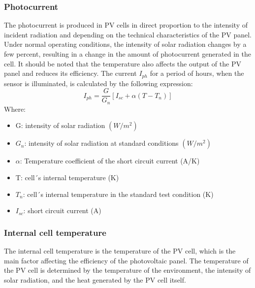 \documentclass{report}
\begin{document}
\subsubsection{Photocurrent}
The photocurrent is produced in PV cells in direct proportion to the intensity of incident radiation and depending on the technical characteristics of the PV panel. Under normal operating conditions, the intensity of solar radiation changes by a few percent, resulting in a change in the amount of photocurrent generated in the cell. It should be noted that the temperature also affects the output of the PV panel and reduces its efficiency. The current $I_{ph}$ for a period of hours, when the sensor is illuminated, is calculated by the following expression:
\begin{equation}
I_{ph} = \frac{G}{G_{n}} 
 \left[ I_{sc} + 	\alpha(T- T_{n}) \right] 
\end{equation}
Where:
\begin{itemize}
    \item G: intensity of solar radiation $(W/m^2)$
    \item $G_{n}$: intensity of solar radiation at standard conditions $(W/m^2)$
    \item $\alpha$: Temperature coefficient of the short circuit current (A/K)
    \item T: cell´s internal temperature (K)
    \item $T_{n}$: cell´s internal temperature in the standard test condition (K)
    \item $I_{sc}$: short circuit current (A)
\end{itemize}

\subsubsection{Internal cell temperature}
The internal cell temperature is the temperature of the PV cell, which is the main factor affecting the efficiency of the photovoltaic panel. The temperature of the PV cell is determined by the temperature of the environment, the intensity of solar radiation, and the heat generated by the PV cell itself. 
\end{document}
